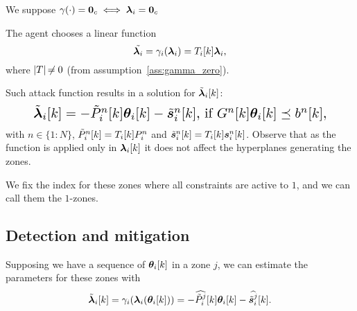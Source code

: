 \documentclass{ifacconf}  %
\begin{document}
\begin{assumption}\label{ass:gamma_zero}
  We suppose $\gamma(\cdot)=\mathbf{0}_{c}\iff\boldsymbol{\lambda}_i=\mathbf{0}_{c}$
\end{assumption}


\begin{assumption}
  The agent chooses a linear function
  \begin{equation}
\tilde{\lambdai}=\gamma_{i}(\vec{\lambda}_{i})=\Tik\vec{\lambda}_{i},
\end{equation}
  where $|T|\not\nobreak\mkern -2mu = 0$ (from assumption~\ref{ass:gamma_zero}).
\end{assumption}

Such attack function results in a \pwa{} solution for $\tilde{\boldsymbol{\lambda}}_i[k]$:
\begin{equation}
  \resizebox{.88\columnwidth}{!}{$
    \label{eq:linear_cheating}
    \lambdaicheat[k]=
      -\tilde{P}_{i}^{n}[k]\thetaik-\tilde{\vec{s}}_{i}^{n}[k]\text{, if}\ G^{n}[k]\thetaik \preceq b^{n}[k],
    $}
\end{equation}
with $n\in\{1\mathbin{:}N\}$, $\tilde{P}_{i}^{n}[k]=\Tik P_{i}^{n}$ and $\tilde{\vec{s}}_{i}^{n}[k]=\Tik\vec{s}_{i}^{n}[k]$.
Observe that as the function is applied only in $\lambdaik$ it does not affect the hyperplanes generating the zones.

We fix the index for these zones where all constraints are active to $1$, and we can call them the $1$-zones.

\subsection{Detection and mitigation}\label{ssec:DM}
Supposing we have a sequence of $\thetaik$ in a zone $j$, we can estimate the parameters for these zones with
\begin{equation}
  \label{eq:lambdafuntheta_tilde}
\lambdaicheat[k]=\gamma_{i}(\lambdai(\thetaik))=-\widehat{\tilde{P}_{i}^{j}}[k]\thetaik-\widehat{\tilde{\vec{s}}_{i}^{j}}[k].
\end{equation}
\end{document}
